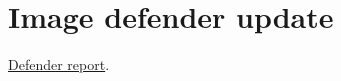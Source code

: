 \section{Image defender
update}\label{record-docs-image-defender-update-results-md-image-defender-update}

\href{../results/research_workflow/image_dda/20261025T155524898195Z/report.md}{Defender
report}.

